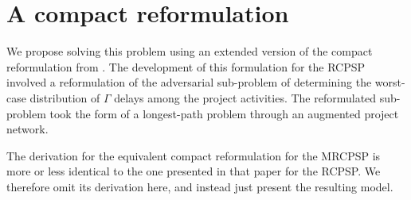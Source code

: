 \documentclass[a4paper,abstracton]{scrartcl}
\begin{document}
\section{A compact reformulation}

We propose solving this problem using an extended version of the compact reformulation from \cite{bold2021compact}. The development of this formulation for the RCPSP involved a reformulation of the adversarial sub-problem of determining the worst-case distribution of $\Gamma$ delays among the project activities. The reformulated sub-problem took the form of a longest-path problem through an augmented project network. 

The derivation for the equivalent compact reformulation for the MRCPSP is more or less identical to the one presented in that paper for the RCPSP. We therefore omit its derivation here, and instead just present the resulting model.
\end{document}

